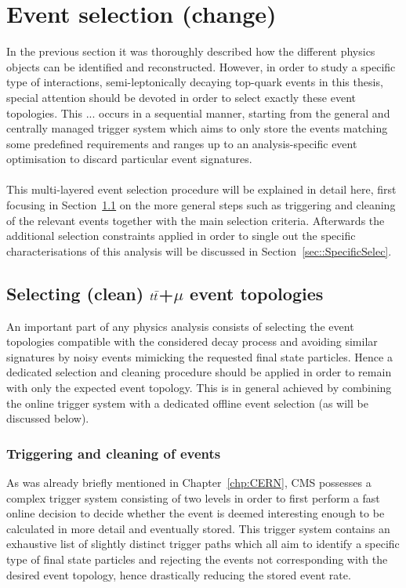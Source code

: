 \chapter{Event selection (change)} \label{chp:labelTitle}

In the previous section it was thoroughly described how the different physics objects can be identified and reconstructed.
However, in order to study a specific type of interactions, semi-leptonically decaying top-quark events in this thesis, special attention should be devoted in order to select exactly these event topologies.
This ... occurs in a sequential manner, starting from the general and centrally managed trigger system which aims to only store the events matching some predefined requirements and ranges up to an analysis-specific event optimisation to discard particular event signatures.
\\
\\
This multi-layered event selection procedure will be explained in detail here, first focusing in Section~\ref{sec::MainSelec} on the more general steps such as triggering and cleaning of the relevant events together with the main selection criteria.
Afterwards the additional selection constraints applied in order to single out the specific characterisations of this analysis will be discussed in Section~\ref{sec::SpecificSelec}.

\section{Selecting (clean) $t\bar{t}$+$\mu$ event topologies}\label{sec::MainSelec}
An important part of any physics analysis consists of selecting the event topologies compatible with the considered decay process and avoiding similar signatures by noisy events mimicking the requested final state particles. Hence a dedicated selection and cleaning procedure should be applied in order to remain with only the expected event topology. This is in general achieved by combining the online trigger system with a dedicated offline event selection (as will be discussed below).

\subsection{Triggering and cleaning of events}\label{subsec::Trigger}
As was already briefly mentioned in Chapter~\ref{chp:CERN}, CMS possesses a complex trigger system consisting of two levels in order to first perform a fast online decision to decide whether the event is deemed interesting enough to be calculated in more detail and eventually stored.
This trigger system contains an exhaustive list of slightly distinct trigger paths which all aim to identify a specific type of final state particles and rejecting the events not corresponding with the desired event topology, hence drastically reducing the stored event rate.

